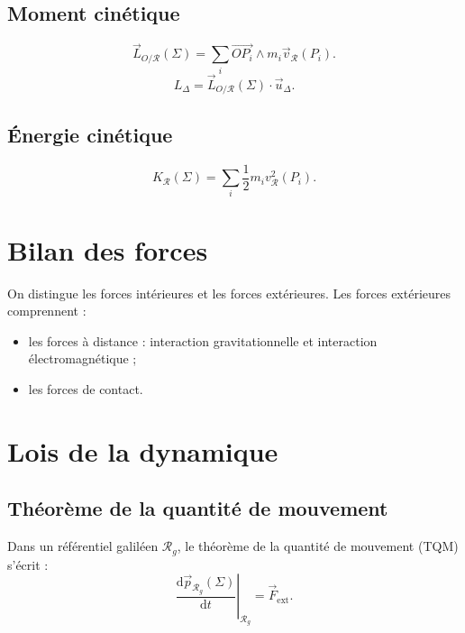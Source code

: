 \documentclass[11pt,a4paper]{article}
\newcommand{\dd}{\mathrm d}
\newcommand{\RR}{\mathcal R}
\begin{document}
\subsection{Moment cinétique}
\[\vec L_{O/\RR}(\Sigma)=\sum_i\overrightarrow{OP_i}\wedge m_i\vec v_{\RR}(P_i).\]
\[L_\Delta=\vec L_{O/\RR}(\Sigma)\cdot\vec u_\Delta.\]
\subsection{Énergie cinétique}
\[K_{\RR}(\Sigma)=\sum_i\frac12m_i v_{\RR}^2(P_i).\]
\section{Bilan des forces}
On distingue les forces intérieures et les forces extérieures. Les forces extérieures comprennent :
\begin{itemize}
\item les forces à distance : interaction gravitationnelle et interaction électromagnétique ;
\item les forces de contact.
\end{itemize}
\section{Lois de la dynamique}
\subsection{Théorème de la quantité de mouvement}
Dans un référentiel galiléen $\RR_g$, le théorème de la quantité de mouvement (TQM) s'écrit :
\[\left.\frac{\dd\vec p_{\RR_g}(\Sigma)}{\dd t}\right|_{\RR_g}=\vec F_{\mathrm{ext}}.\]
\end{document}
